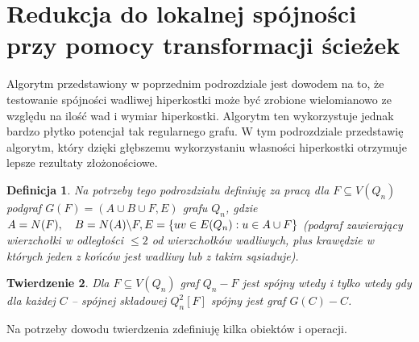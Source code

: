 \documentclass{pracamgr}
\newtheorem{theorem}{Twierdzenie}[chapter]
\newtheorem{defi}[theorem]{Definicja} %
\begin{document}
  \section{Redukcja do lokalnej spójności przy pomocy transformacji ścieżek}\label{spojnosc 2}
   Algorytm przedstawiony w poprzednim podrozdziale jest dowodem na to, że testowanie spójności wadliwej hiperkostki może być zrobione wielomianowo
   ze względu na ilość wad i wymiar hiperkostki. Algorytm ten wykorzystuje jednak bardzo płytko potencjał tak regularnego grafu.
   W tym podrozdziale przedstawię algorytm, który dzięki głębszemu wykorzystaniu własności hiperkostki otrzymuje lepsze rezultaty złożonościowe.
   \begin{defi}\label{podgrafy kostki}
    Na potrzeby tego podrozdziału definiuję za pracą \cite{DFGKR} dla $F\subseteq V(Q_n)$\newline
    podgraf $G(F)=(A\cup B\cup F,E)$ grafu $Q_n$,
    gdzie $A=N(F),\quad B=N(A)\backslash F,\newline E=\{uv\in E(Q_n):u\in A\cup F\}$ (podgraf zawierający wierzchołki w odległości $\le 2$ od wierzchołków wadliwych,
    plus krawędzie w których jeden z końców jest wadliwy lub z takim sąsiaduje).
   \end{defi}
   \begin{theorem}\label{spojnosc z lokalnej spojnosci}
    Dla $F\subseteq V(Q_n)$ graf $Q_n-F$ jest spójny wtedy i tylko wtedy gdy dla każdej $C$ -- spójnej składowej $Q_n^2[F]$ spójny jest graf $G(C)-C$.
   \end{theorem}
   Na potrzeby dowodu twierdzenia zdefiniuję kilka obiektów i operacji.
\end{document}
